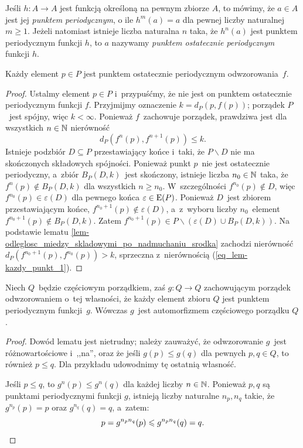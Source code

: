 Jeśli $h\colon A\to A$ jest funkcją określoną na pewnym zbiorze $A$, to mówimy, że $a\in A$ jest jej \textit{punktem periodycznym}, o ile $h^m(a)=a$ dla pewnej liczby naturalnej $m\geq 1$. Jeżeli natomiast istnieje liczba naturalna $n$ taka, że $h^{n}(a)$ jest punktem periodycznym funkcji $h$, to $a$ nazywamy \textit{punktem ostatecznie periodycznym} funkcji $h$.

\begin{lem}\label{lem-kazdy_punkt_ost_periodyczny}
Każdy element $p\in P$ jest punktem ostatecznie periodycznym odwzorowania~$f$. 
\end{lem}
\begin{proof}
Ustalmy element $p\in P$ i~przypuśćmy, że nie jest on punktem ostatecznie periodycznym funkcji $f$. Przyjmijmy oznaczenie $k=d_P(p,f(p))$; porządek $P$~jest spójny, więc $k<\infty$. Ponieważ $f$~zachowuje porządek, prawdziwa jest dla wszystkich $n\in\mN$ nierówność 
\begin{equation}d_P\left(f^n(p),f^{n+1}(p)\right)\leq k.\label{eq_lem-kazdy_punkt_1}\end{equation} Istnieje podzbiór $D\subseteq P$ przestawiający końce i~taki, że $P\smallsetminus D$ nie ma skończonych składowych spójności.  Ponieważ punkt $p$~nie jest ostatecznie periodyczny, a~zbiór $B_P(D,k)$~jest skończony, istnieje liczba $n_0\in\mN$ taka, że $f^n(p)\not\in B_P(D,k)$ dla wszystkich $n\geq n_0$. W~szczególności $f^{n_0}(p)\not\in D$, więc $f^{n_0}(p)\in \varepsilon(D)$ dla pewnego końca $\varepsilon\in\E(P)$. Ponieważ $D$~jest zbiorem przestawiającym końce, $f^{n_0+1}(p)\not\in \varepsilon(D)$, a~z~wyboru liczby $n_0$~element $f^{n_0+1}(p)\not\in B_P(D,k)$. Zatem $f^{n_0+1}(p)\in P\smallsetminus (\varepsilon(D)\cup B_P(D,k))$. Na podstawie lematu \ref{lem-odleglosc_miedzy_skladowymi_po_nadmuchaniu_srodka} zachodzi nierówność $d_P\left(f^{n_0+1}(p),f^{n_0}(p)\right)> k$, sprzeczna z~nierównością (\ref{eq_lem-kazdy_punkt_1}).
\end{proof}

\begin{lem}\label{lem-wsz_per_odw_aut}
Niech $Q$~będzie częściowym porządkiem, zaś $g\colon Q\to Q$ zachowującym porządek odwzorowaniem o~tej własności, że każdy element zbioru $Q$ jest punktem periodycznym funkcji~$g$. Wówczas $g$~jest automorfizmem częściowego porządku $Q$.
\end{lem}
\begin{proof}
Dowód lematu jest nietrudny; należy zauważyć, że odwzorowanie $g$~jest różnowartościowe i~,,na'', oraz że jeśli $g(p)\leq g(q)$ dla pewnych $p,q\in Q$, to również $p\leq q$. Dla przykładu udowodnimy tę ostatnią własność. 

Jeśli $p\leq q$, to $g^n(p)\leq g^n(q)$ dla każdej liczby $n\in\mN$. Ponieważ $p,q$ są punktami periodycznymi funkcji $g$, istnieją liczby naturalne $n_p,n_q$ takie, że $g^{n_p}(p)=p$ oraz $g^{n_q}(q)=q$, a~zatem: \[p=g^{n_p n_q}(p)\leq g^{n_p n_q}(q)=q.\qedhere\]
\end{proof}

